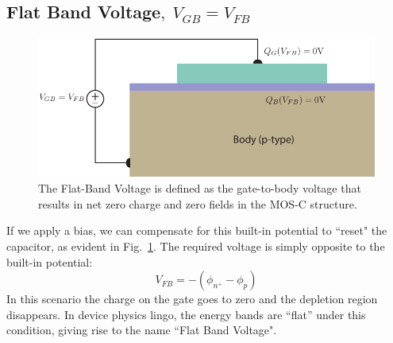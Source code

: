 \subsection{Flat Band Voltage\texorpdfstring{$,\;V_{GB}=V_{FB}$}{}}
\begin{figure}[tbh]
\centering
\includegraphics[width=.75\columnwidth]{mos_cap_flatband}
\caption{The Flat-Band Voltage is defined as the gate-to-body voltage that results in net zero charge and zero fields in the MOS-C structure.}
\label{fig:mos_flatband}
\end{figure}
If we apply a bias, we can compensate for this built-in potential to ``reset" the capacitor, as evident in Fig.~\ref{fig:mos_flatband}.  The required voltage is simply opposite to the built-in potential:
    \begin{equation}
        {V_{FB}} =  - ({\phi _{{n^ + }}} - {\phi _p})
    \end{equation}
In this scenario the charge on the gate goes to zero and the depletion region disappears.  In device physics lingo, the energy bands are “flat” under this condition, giving rise to the name ``Flat Band Voltage".
